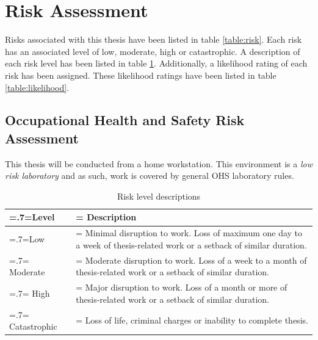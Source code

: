 \documentclass[twocolumn]{article}
\begin{document}

\section{Risk Assessment}
Risks associated with this thesis have been listed in table \ref{table:risk}. Each risk has an associated level of low, moderate, high or catastrophic. A description of each risk level has been listed in table \ref{table:risklevel}. Additionally, a likelihood rating of each risk has been assigned. These likelihood ratings have been listed in table \ref{table:likelihood}.

\subsection{Occupational Health and Safety Risk Assessment}
This thesis will be conducted from a home workstation. This environment is a \textit{low risk laboratory} and as such, work is covered by general OHS laboratory rules.

\clearpage
\begin{table}
    \begin{center}
        \begin{tabularx}{\linewidth} { 
            | >{\hsize=.7\hsize\linewidth=\hsize}X 
            | >{\hsize=1.3\hsize\linewidth=\hsize}X  | }
            \hline
            \textbf{Level} & \textbf{Description} \\
            \hline
            Low & Minimal disruption to work. Loss of maximum one day to a week of thesis-related work or a setback of similar duration. \\
            \hline
            Moderate & Moderate disruption to work. Loss of a week to a month of thesis-related work or a setback of similar duration. \\
            \hline
            High & Major disruption to work. Loss of a month or more of thesis-related work or a setback of similar duration. \\
            \hline
            Catastrophic & Loss of life, criminal charges or inability to complete thesis. \\
            \hline
        \end{tabularx}
    \end{center}
    \caption{Risk level descriptions}
    \label{table:risklevel}
\end{table}
\end{document}
